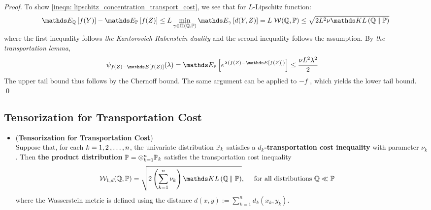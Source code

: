 \documentclass[11pt]{article}
\begin{document}
\begin{itemize}
\begin{proof}
To show \eqref{ineqn: lipschitz_concentration_transport_cost}, we see that for $L$-Lipschitz function:
\begin{align*}
\E{\bQ}{f(Y)} - \E{\bP}{f(Z)} \le L\min_{\gamma \in \Pi (\bQ, \bP)} \E{\gamma}{d(Y, Z)} = L \;\cW(\bQ, \bP) \le \sqrt{2 L^2 \nu \kl{\bQ}{\bP}}
\end{align*} where the first inequality follows \emph{the Kantorovich-Rubenstein duality} and the second inequality follows the assumption. By \emph{the transportation lemma}, 
\begin{align*}
\psi_{f(Z) - \E{}{f(Z)}}(\lambda) = \E{\bP}{e^{\lambda \paren{f(Z) - \E{}{f(Z)}}}} &\le \frac{\nu L^2 \lambda^2}{2}
\end{align*} The upper tail bound thus follows by the Chernoff bound. The same argument can be applied to  $-f$ , which yields the lower tail bound. \qed
\end{proof}

\end{itemize}
\subsection{Tensorization for Transportation Cost}
\begin{itemize}
\item \begin{proposition} (\textbf{Tensorization for Transportation Cost}) \citep{boucheron2013concentration}\\
Suppose that, for each $k = 1, 2 \,{,}\ldots{,}\, n$, the univariate distribution ${\mathbb P}_k$ satisfies a \textbf{$d_k$-transportation cost inequality} with parameter $\nu_k$. Then \textbf{the product distribution} ${\mathbb P} = \otimes_{k=1}^n {\mathbb P}_k$ satisfies the transportation cost inequality
\begin{align}
\cW_{1, d}(\bQ, \bP) &= \sqrt{2\paren{\sum_{k=1}^n \nu_k} \kl{\bQ}{\bP}}, \quad \text{ for all distributions $\bQ \ll \bP$ } \label{ineqn: tensorization_transport_cost}
\end{align}  where the Wasserstein metric is defined using the distance $d(x, y) :=  \sum_{k=1}^{n}d_k(x_k, y_k)$.
\end{proposition}
\end{itemize}

\end{document}
